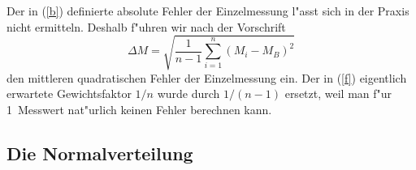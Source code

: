 Der in (\ref{b}) definierte absolute Fehler der
Einzelmessung l"asst sich in der
Praxis nicht ermitteln. Deshalb f"uhren wir nach der Vorschrift
%
\begin{equation} \label{f}
 \Delta M = \sqrt{
  \frac{1}{n-1} \sum_{i=1}^{n} \left( M_{i} - M_{B} \right)^{2}
 }
\end{equation}
%
den mittleren quadratischen Fehler der Einzelmessung ein. Der in
(\ref{f}) eigentlich erwartete Gewichtsfaktor $1/n$ wurde durch
$1/(n-1)$ ersetzt, weil man f"ur 1~Messwert nat"urlich keinen Fehler
berechnen kann.


\subsection{Die Normalverteilung}

